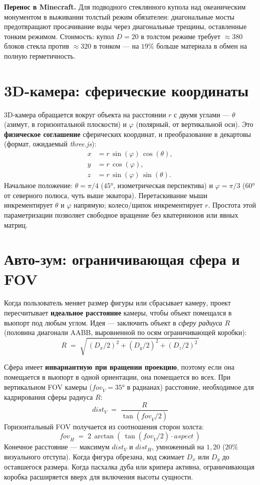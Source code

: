 \documentclass[12pt,a4paper]{scrartcl}
\newcommand{\acc}[1]{\textcolor{accent}{\textbf{#1}}}
\begin{document}
\begin{minec}
\textbf{Перенос в Minecraft.} Для подводного стеклянного купола над океаническим монументом в выживании толстый режим обязателен: диагональные мосты предотвращают просачивание воды через диагональные трещины, оставленные тонким режимом. Стоимость: купол $D=20$ в толстом режиме требует $\approx 380$ блоков стекла против $\approx 320$ в тонком — на $19\%$ больше материала в обмен на полную герметичность.
\end{minec}

\section{3D-камера: сферические координаты}

3D-камера обращается вокруг объекта на расстоянии $r$ с двумя углами — $\theta$ (азимут, в горизонтальной плоскости) и $\varphi$ (полярный, от вертикальной оси). Это \acc{физическое соглашение} сферических координат, и преобразование в декартовы (формат, ожидаемый \emph{three.js}):
\[
\begin{aligned}
x &= r\,\sin(\varphi)\,\cos(\theta), \\
y &= r\,\cos(\varphi), \\
z &= r\,\sin(\varphi)\,\sin(\theta).
\end{aligned}
\]
Начальное положение: $\theta = \pi/4$ ($45°$, изометрическая перспектива) и $\varphi = \pi/3$ ($60°$ от северного полюса, чуть выше экватора). Перетаскивание мыши инкрементирует $\theta$ и $\varphi$ напрямую; колесо/щипок инкрементирует $r$. Простота этой параметризации позволяет свободное вращение без кватернионов или явных матриц.

\section{Авто-зум: ограничивающая сфера и FOV}

Когда пользователь меняет размер фигуры или сбрасывает камеру, проект пересчитывает \acc{идеальное расстояние} камеры, чтобы объект помещался в вьюпорт под любым углом. Идея — заключить объект в \emph{сферу радиуса $R$} (половина диагонали AABB, выровненной по осям ограничивающей коробки):
\[
R \;=\; \sqrt{\,(D_x/2)^2 + (D_y/2)^2 + (D_z/2)^2\,}
\]

Сфера имеет \acc{инвариантную при вращении проекцию}, поэтому если она помещается в вьюпорт в одной ориентации, она помещается во всех. При вертикальном FOV камеры ($\mathit{fov}_V = 35°$ в радианах) расстояние, необходимое для кадрирования сферы радиуса $R$:
\[
\mathit{dist}_V \;=\; \dfrac{R}{\tan(\mathit{fov}_V / 2)}
\]
Горизонтальный FOV получается из соотношения сторон холста:
\[
\mathit{fov}_H \;=\; 2\,\arctan\!\left(\,\tan(\mathit{fov}_V/2)\cdot \mathit{aspect}\,\right)
\]
Конечное расстояние — максимум $\mathit{dist}_V$ и $\mathit{dist}_H$, умноженный на $1{,}20$ ($20\%$ визуального отступа). Когда фигура обрезана, код сжимает $D_x$ или $D_y$ до оставшегося размера. Когда пасхалка дуба или крипера активна, ограничивающая коробка расширяется вверх для включения высоты сущности.
\end{document}
